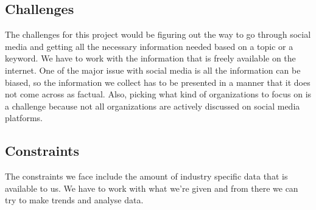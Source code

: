 \documentclass[12pt]{article}
\begin{document}
\subsection*{Challenges}
The challenges for this project would be figuring out the way to go through social media and getting all the necessary information needed based on a topic or a keyword. We have to work with the information that is freely available on the internet. One of the major issue with social media is all the information can be biased, so the information we collect has to be presented in a manner that it does not come across as factual. Also, picking what kind of organizations to focus on is a challenge because not all organizations are actively discussed on social media platforms.\\

\subsection*{Constraints}
The constraints we face include the amount of industry specific data that is available to us. We have to work with what we’re given and from there we can try to make trends and analyse data. 


 
\end{document}
